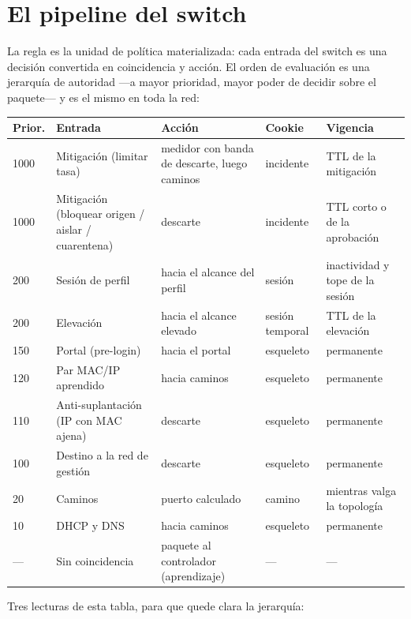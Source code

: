 \documentclass[11pt,a4paper]{article}
\begin{document}
\section{El pipeline del switch}

La regla es la unidad de política materializada: cada entrada del switch es una decisión convertida en coincidencia y acción. El orden de evaluación es una jerarquía de autoridad ---a mayor prioridad, mayor poder de decidir sobre el paquete--- y es el mismo en toda la red:

\begin{longtable}{p{1.8cm}p{4.6cm}p{3.4cm}p{2.2cm}p{2.0cm}}
\toprule
\textbf{Prior.} & \textbf{Entrada} & \textbf{Acción} & \textbf{Cookie} & \textbf{Vigencia}\\
\midrule
1000 & Mitigación (limitar tasa) & medidor con banda de descarte, luego caminos & incidente & TTL de la mitigación\\
1000 & Mitigación (bloquear origen / aislar / cuarentena) & descarte & incidente & TTL corto o de la aprobación\\
200 & Sesión de perfil & hacia el alcance del perfil & sesión & inactividad y tope de la sesión\\
200 & Elevación & hacia el alcance elevado & sesión temporal & TTL de la elevación\\
150 & Portal (pre-login) & hacia el portal & esqueleto & permanente\\
120 & Par MAC/IP aprendido & hacia caminos & esqueleto & permanente\\
110 & Anti-suplantación (IP con MAC ajena) & descarte & esqueleto & permanente\\
100 & Destino a la red de gestión & descarte & esqueleto & permanente\\
20 & Caminos & puerto calculado & camino & mientras valga la topología\\
10 & DHCP y DNS & hacia caminos & esqueleto & permanente\\
--- & Sin coincidencia & paquete al controlador (aprendizaje) & --- & ---\\
\bottomrule
\end{longtable}

Tres lecturas de esta tabla, para que quede clara la jerarquía:
\end{document}

